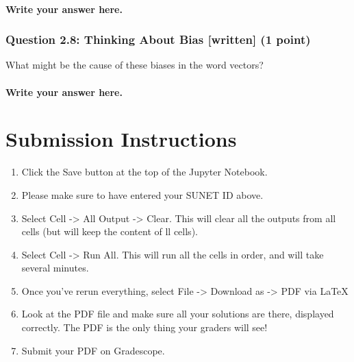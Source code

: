 \documentclass[11pt]{article}
\providecommand{\tightlist}{%
      \setlength{\itemsep}{0pt}\setlength{\parskip}{0pt}}
\begin{document}
    \paragraph{Write your answer here.}\label{write-your-answer-here.}

    \subsubsection{Question 2.8: Thinking About Bias {[}written{]} (1
point)}\label{question-2.8-thinking-about-bias-written-1-point}

What might be the cause of these biases in the word vectors?

    \paragraph{Write your answer here.}\label{write-your-answer-here.}

    \section{ Submission Instructions}\label{submission-instructions}

\begin{enumerate}
\def\labelenumi{\arabic{enumi}.}
\tightlist
\item
  Click the Save button at the top of the Jupyter Notebook.
\item
  Please make sure to have entered your SUNET ID above.
\item
  Select Cell -\textgreater{} All Output -\textgreater{} Clear. This
  will clear all the outputs from all cells (but will keep the content
  of ll cells).
\item
  Select Cell -\textgreater{} Run All. This will run all the cells in
  order, and will take several minutes.
\item
  Once you've rerun everything, select File -\textgreater{} Download as
  -\textgreater{} PDF via LaTeX
\item
  Look at the PDF file and make sure all your solutions are there,
  displayed correctly. The PDF is the only thing your graders will see!
\item
  Submit your PDF on Gradescope.
\end{enumerate}


    
    
    
    
\end{document}
